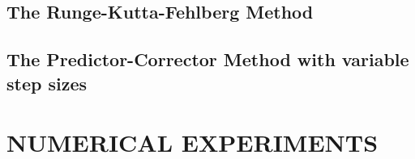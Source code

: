 \documentclass[12pt,oneside]{book}
\begin{document}
	
	\section{The Runge-Kutta-Fehlberg Method}
	
	
	\section{The Predictor-Corrector Method with variable step sizes}
	
	\chapter{NUMERICAL EXPERIMENTS}
	
	
	

	\backmatter
	
	\renewcommand{\bibname}{REFERENCES}
	
	
\end{document}
